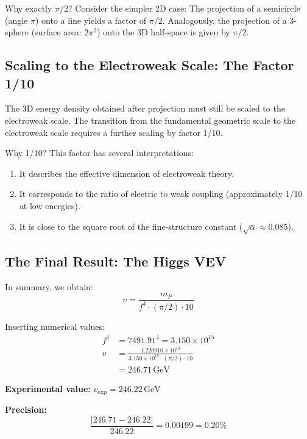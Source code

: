 	Why exactly \(\pi/2\)? Consider the simpler 2D case: The projection of a semicircle (angle \(\pi\)) onto a line yields a factor of \(\pi/2\). Analogously, the projection of a 3-sphere (surface area: \(2\pi^2\)) onto the 3D half-space is given by \(\pi/2\).
	
	\subsection{Scaling to the Electroweak Scale: The Factor 1/10}
	
	The 3D energy density obtained after projection must still be scaled to the electroweak scale. The transition from the fundamental geometric scale to the electroweak scale requires a further scaling by factor 1/10.
	
	Why 1/10? This factor has several interpretations:
	\begin{enumerate}
		\item It describes the effective dimension of electroweak theory.
		\item It corresponds to the ratio of electric to weak coupling (approximately 1/10 at low energies).
		\item It is close to the square root of the fine-structure constant (\(\sqrt{\alpha} \approx 0.085\)).
	\end{enumerate}
	
	\subsection{The Final Result: The Higgs VEV}
	
	In summary, we obtain:
	\begin{equation}
		\boxed{v = \frac{m_P}{f^4 \cdot (\pi/2) \cdot 10}}
	\end{equation}
	
	Inserting numerical values:
	\begin{align}
		f^4 &= 7491.91^4 = 3.150 \times 10^{15} \\
		v &= \frac{1.220910 \times 10^{19}}{3.150 \times 10^{15} \cdot (\pi/2) \cdot 10} \\
		&= 246.71\,\text{GeV}
	\end{align}
	
	\textbf{Experimental value:} \(v_{\exp} = 246.22\,\text{GeV}\)
	
	\textbf{Precision:}
	\begin{equation}
		\frac{|246.71 - 246.22|}{246.22} = 0.00199 = 0.20\%
	\end{equation}
	
